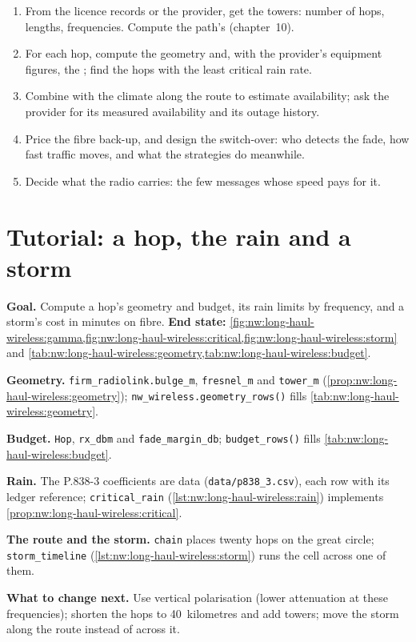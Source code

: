 \begin{method}\label{met:nw:long-haul-wireless:eval}
\begin{enumerate}
\item From the licence records or the provider, get the towers: number of hops, lengths, frequencies. Compute the path's 
  (chapter~10).
\item For each hop, compute the geometry and, with the provider's equipment figures, the ; find the hops with the least critical
  rain rate.
\item Combine with the climate along the route to estimate availability; ask the provider for its measured availability and its outage history.
\item Price the fibre back-up, and design the switch-over: who detects the fade, how fast traffic moves, and what the strategies do meanwhile.
\item Decide what the radio carries: the few messages whose speed pays for it.
\end{enumerate}
\end{method}

\section{Tutorial: a hop, the rain and a storm}\label{tut:nw:long-haul-wireless:tut}

\begin{tutorial}
\textbf{Goal.} Compute a hop's geometry and budget, its rain limits by frequency, and a storm's cost in minutes on fibre.
\textbf{End state:} \cref{fig:nw:long-haul-wireless:gamma,fig:nw:long-haul-wireless:critical,fig:nw:long-haul-wireless:storm} and
\cref{tab:nw:long-haul-wireless:geometry,tab:nw:long-haul-wireless:budget}.
\begin{tutsteps}
\item \textbf{Geometry.} \texttt{firm\_radiolink.bulge\_m}, \texttt{fresnel\_m} and \texttt{tower\_m} (\cref{prop:nw:long-haul-wireless:geometry});
  \texttt{nw\_wireless.geometry\_rows()} fills \cref{tab:nw:long-haul-wireless:geometry}.
\item \textbf{Budget.} \texttt{Hop}, \texttt{rx\_dbm} and \texttt{fade\_margin\_db}; \texttt{budget\_rows()} fills
  \cref{tab:nw:long-haul-wireless:budget}.
\item \textbf{Rain.} The P.838-3 coefficients are data (\texttt{data/p838\_3.csv}), each row with its ledger reference;
  \texttt{critical\_rain} (\cref{lst:nw:long-haul-wireless:rain}) implements \cref{prop:nw:long-haul-wireless:critical}.
\item \textbf{The route and the storm.} \texttt{chain} places twenty hops on the great circle; \texttt{storm\_timeline}
  (\cref{lst:nw:long-haul-wireless:storm}) runs the cell across one of them.
\end{tutsteps}
\textbf{What to change next.} Use vertical polarisation (lower attenuation at these frequencies); shorten the hops to 40~kilometres and add
towers; move the storm along the route instead of across it.
\end{tutorial}

